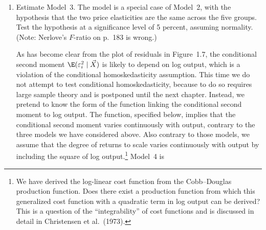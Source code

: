 \begin{problemset}
\begin{enumerate}[label=(\alph*)]
\medskip
The restriction in Model~3 that the price elasticities are the same across
firm groups can be imposed on Model~2 by applying the dummy variable
transformation only to the constant and log output. Thus, there are
$12$ ($= 2 \times 5 + 2$) variables in $\vec{X}$. Now $\vec{X}$ looks like
%
\begin{equation}
\vec{X} =
\begin{bmatrix}
1      & \log(Q_1)      & 0 & 0 & \log(PL_1/PF_1)       & \log(PK_1/PF_1) \\
\vdots & \vdots         & \vdots & \vdots & \vdots        & \vdots \\
1      & \log(Q_{29})   & 0 & 0 & \log(PL_{29}/PF_{29})  & \log(PK_{29}/PF_{29}) \\
       &                & \ddots &        & \vdots        & \vdots \\
0      & 0              & 1 & \log(Q_{117})  & \log(PL_{117}/PF_{117}) & \log(PK_{117}/PF_{117}) \\
\vdots & \vdots         & \vdots & \vdots & \vdots        & \vdots \\
0      & 0              & 1 & \log(Q_{145})  & \log(PL_{145}/PF_{145}) & \log(PK_{145}/PF_{145})
\end{bmatrix}
\tag{$**$} \label{eq:ps1.emp.starstar}
\end{equation}

\item Estimate Model~3. The model is a special case of Model~2, with the
hypothesis that the two price elasticities are the same across the five
groups. Test the hypothesis at a significance level of 5 percent, assuming
normality. (Note: Nerlove's $F$-ratio on p.~183 is wrong.)

\medskip
As has become clear from the plot of residuals in Figure~1.7, the
conditional second moment $\E(\varepsilon_i^2 \mid \vec{X})$ is likely to
depend on log output, which is a violation of the conditional
homoskedasticity assumption. This time we do not attempt to test conditional
homoskedasticity, because to do so requires large sample theory and is
postponed until the next chapter. Instead, we pretend to know the form of the
function linking the conditional second moment to log output. The function,
specified below, implies that the conditional second moment varies
continuously with output, contrary to the three models we have considered
above. Also contrary to those models, we assume that the degree of returns
to scale varies continuously with output by including the square of log
output.\footnote{We have derived the log-linear cost function from the
Cobb--Douglas production function. Does there exist a production function
from which this generalized cost function with a quadratic term in log output
can be derived? This is a question of the ``integrability'' of cost functions
and is discussed in detail in Christensen et al.\ (1973).}
Model~4 is


\end{enumerate}
\end{problemset}
